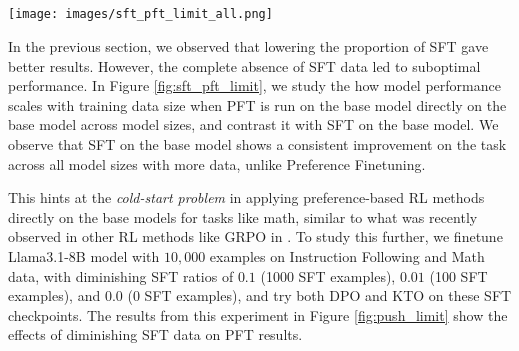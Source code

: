  

\subsection{\RQTwo}


\begin{figure*}[!ht]
    \centering
    \texttt{[image: images/sft\_pft\_limit\_all.png]}
    \caption{Scaling patterns of SFT and PFT (using DPO) directly on the Llama3 models - 8B\textbf{(top)}, 3B \textbf{(middle)} and 1B\textbf{(bottom)}. We observe that SFT shows a consistent improvement on the task across all model sizes. However, directly applying PFT shows improvements only in large data-regimes, and only in larger model sizes.}
    
    \label{fig:sft_pft_limit}
\end{figure*}

In the previous section, we observed that lowering the proportion of SFT gave better results. However, the complete absence of SFT data led to suboptimal performance. In Figure \ref{fig:sft_pft_limit}, we study the how model performance scales with training data size when PFT is run on the base model directly on the base model across model sizes, and contrast it with SFT on the base model. We observe that SFT on the base model shows a consistent improvement on the task across all model sizes with more data, unlike Preference Finetuning.


This hints at the \textit{cold-start problem} in applying preference-based RL methods directly on the base models for tasks like math, similar to what was recently observed in other RL methods like GRPO in \citet{shao2024deepseekmathpushinglimitsmathematical, guo2025deepseek}. To study this further, we finetune Llama3.1-8B model with $10,000$ examples on Instruction Following and Math data, with diminishing SFT ratios of $0.1$ (1000 SFT examples), $0.01$ (100 SFT examples), and $0.0$ (0 SFT examples), and try both DPO and KTO on these SFT checkpoints. The results from this experiment in Figure \ref{fig:push_limit} show the effects of diminishing SFT data on PFT results. 

